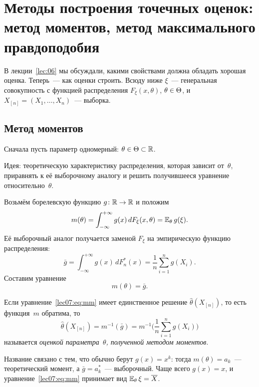 \section[Метод моментов. Метод максимального правдоподобия]%
  {Методы построения точечных оценок: метод моментов,
   метод максимального правдоподобия}
\label{lec:07}

В лекции~\ref{lec:06} мы обсуждали, какими свойствами должна обладать хорошая оценка.
Теперь~--- как оценки строить. Всюду ниже $\xi$~--- генеральная совокупность с функцией
распределения $F_\xi(x, \theta)$, $\theta \in \Theta$, и $X_{[n]} = (X_1, \ldots, X_n)$~--- выборка.

\subsection{Метод моментов}
\label{lec07:moments}

Сначала пусть параметр одномерный: $\theta \in \Theta \subset \mathbb{R}$.

Идея: теоретическую характеристику распределения, которая зависит от~$\theta$, приравнять
к её выборочному аналогу и решить получившееся уравнение относительно~$\theta$.

Возьмём борелевскую функцию $g \colon \mathbb{R} \to \mathbb{R}$ и положим
\[
  m(\theta) = \int_{-\infty}^{+\infty} g(x)\, dF_\xi(x, \theta) = \mathbb{E}_\theta\, g(\xi).
\]
Её выборочный аналог получается заменой $F_\xi$ на эмпирическую функцию распределения:
\[
  \bar g = \int_{-\infty}^{+\infty} g(x)\, dF_n^*(x) = \frac1n \sum_{i=1}^n g(X_i).
\]
Составим уравнение
\begin{equation}
  \label{lec07:eq:mm}
  m(\theta) = \bar g.
\end{equation}

\begin{definition}
  Если уравнение~\eqref{lec07:eq:mm} имеет единственное решение $\hat\theta(X_{[n]})$, то есть
  функция~$m$ обратима, то
  \[
    \hat\theta(X_{[n]}) = m^{-1}(\bar g) = m^{-1}\biggl(\frac1n \sum_{i=1}^n g(X_i)\biggr)
  \]
  называется \emph{оценкой параметра~$\theta$, полученной методом моментов}.
\end{definition}

Название связано с тем, что обычно берут $g(x) = x^k$: тогда $m(\theta) = a_k$~---
теоретический момент, а $\bar g = a_k^*$~--- выборочный. Чаще всего $g(x) = x$, и
уравнение~\eqref{lec07:eq:mm} принимает вид $\mathbb{E}_\theta\,\xi = \overline{X}$.

